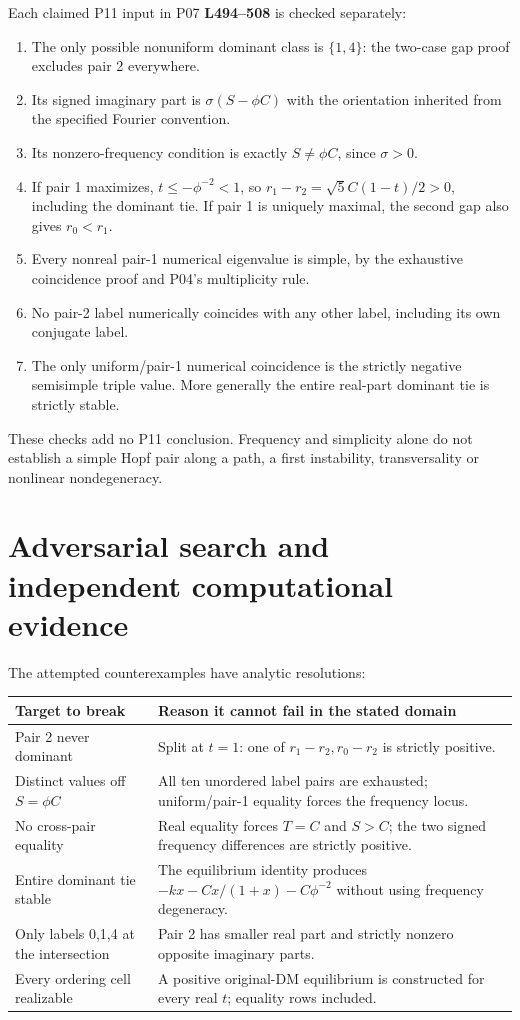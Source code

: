 \documentclass[11pt]{article}
\newcommand{\lin}[1]{\textbf{L#1}}
\begin{document}
Each claimed P11 input in P07 \lin{494--508} is checked separately:
\begin{enumerate}
\item The only possible nonuniform dominant class is $\{1,4\}$:
the two-case gap proof excludes pair 2 everywhere.
\item Its signed imaginary part is $\sigma(S-\phi C)$ with the
orientation inherited from the specified Fourier convention.
\item Its nonzero-frequency condition is exactly $S\ne\phi C$,
since $\sigma>0$.
\item If pair 1 maximizes, $t\le-\phi^{-2}<1$, so
$r_1-r_2=\sqrt5 C(1-t)/2>0$, including the dominant tie.
If pair 1 is uniquely maximal, the second gap also gives $r_0<r_1$.
\item Every nonreal pair-1 numerical eigenvalue is simple, by the
exhaustive coincidence proof and P04's multiplicity rule.
\item No pair-2 label numerically coincides with any other label,
including its own conjugate label.
\item The only uniform/pair-1 numerical coincidence is the strictly
negative semisimple triple value. More generally the entire real-part
dominant tie is strictly stable.
\end{enumerate}
These checks add no P11 conclusion. Frequency and simplicity alone
do not establish a simple Hopf pair along a path, a first instability,
transversality or nonlinear nondegeneracy.

\section{Adversarial search and independent computational evidence}
\label{sec:checks}
The attempted counterexamples have analytic resolutions:
\begin{longtable}{@{}L{0.37\textwidth}L{0.58\textwidth}@{}}
\toprule Target to break&Reason it cannot fail in the stated domain\\\midrule\endhead
Pair 2 never dominant&Split at $t=1$: one of $r_1-r_2,r_0-r_2$ is strictly positive.\\
Distinct values off $S=\phi C$&All ten unordered label pairs are exhausted; uniform/pair-1 equality forces the frequency locus.\\
No cross-pair equality&Real equality forces $T=C$ and $S>C$; the two signed frequency differences are strictly positive.\\
Entire dominant tie stable&The equilibrium identity produces $-kx-Cx/(1+x)-C\phi^{-2}$ without using frequency degeneracy.\\
Only labels 0,1,4 at the intersection&Pair 2 has smaller real part and strictly nonzero opposite imaginary parts.\\
Every ordering cell realizable&A positive original-DM equilibrium is constructed for every real $t$; equality rows included.\\
\bottomrule
\end{longtable}
\end{document}
